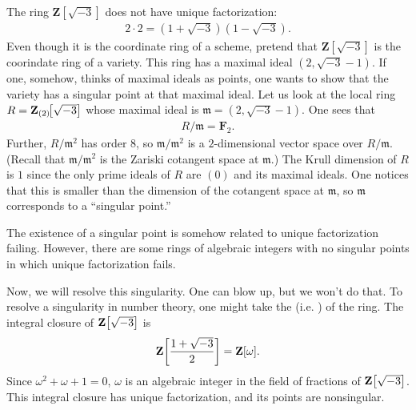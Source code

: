 \documentclass[11pt, oneside,margin=1in]{article}
\begin{document}
\begin{example}[ ]\label{}\text{}
The ring $\mathbf{Z}\!\left[\sqrt{-3}\right]$ does not have unique factorization:
\begin{align*}
	2\cdot 2 = (1+\sqrt{-3} ) (1-\sqrt{-3} ).
\end{align*}
Even though it is the coordinate ring of a scheme, pretend that $\mathbf{Z}\!\left[\sqrt{-3}\right]$ is the coorindate ring of a variety. This ring has a maximal ideal $(2,\sqrt{-3}-1 )$. If one, somehow, thinks of maximal ideals as points, one wants to show that the variety has a singular point at that maximal ideal. Let us look at the local ring $R=\mathbf Z_{(2)} \!\!\left[ \sqrt{-3}  \right] $ whose maximal ideal is $\mathfrak{m}=(2,\sqrt{-3}-1 )$. One sees that \begin{align*}
	R/\mathfrak{m} = \mathbf{F}_{2}.
\end{align*}
Further, $R/\mathfrak{m}^2$ has order $8$, so $\mathfrak{m}/\mathfrak{m}^2$ is a $2$-dimensional vector space over $R/\mathfrak{m}$. (Recall that $\mathfrak{m}/\mathfrak{m}^2$ is the Zariski cotangent space at $\mathfrak{m}$.) The Krull dimension of $R$ is $1$ since the only prime ideals of $R$ are $(0)$ and its maximal ideals. One notices that this is smaller than the dimension of the cotangent space at $\mathfrak{m}$, so $\mathfrak{m}$ corresponds to a ``singular point.''

\begin{remark}
	The existence of a singular point is somehow related to unique factorization failing. However, there are some rings of algebraic integers with no singular points in which unique factorization fails. 
\end{remark}

Now, we will resolve this singularity. One can blow up, but we won't do that. To resolve a singularity in number theory, one might take the  (i.e. ) of the ring. The integral closure of $\mathbf Z\!\left[ \sqrt{-3}  \right] $ is
\begin{align*}
	\mathbf Z \!\left[ \frac{1+\sqrt{-3} }{2} \right] = \mathbf Z[\omega] .
\end{align*}
Since $\omega^2+\omega+1=0$, $\omega$ is an algebraic integer in the field of fractions of $\mathbf Z\!\left[ \sqrt{-3}  \right] $. This integral closure has unique factorization, and its points are nonsingular.
\end{example}
\end{document}
